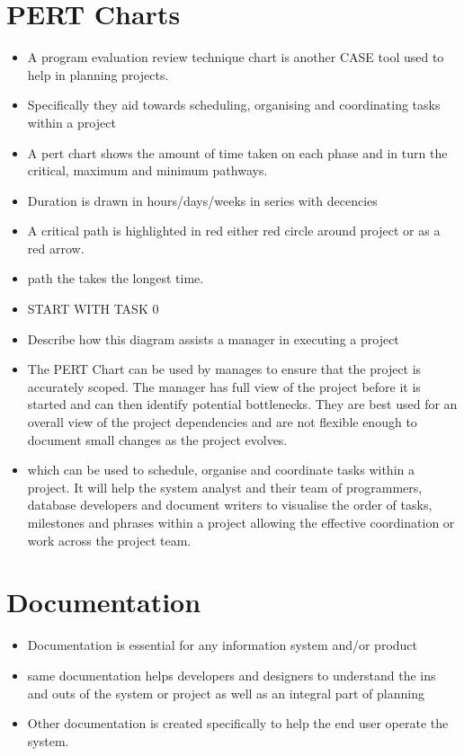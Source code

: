 \documentclass[12pt, a4, twoside]{article}
\begin{document}
  \section{PERT Charts}
  \begin{itemize}
    \item A program evaluation review technique chart is another CASE tool used to help in planning projects.
    \item Specifically they aid towards scheduling, organising and coordinating tasks within a project
    \item A pert chart shows the amount of time taken on each phase and in turn the critical, maximum and minimum pathways.
    \item Duration is drawn in hours/days/weeks in series with decencies
    \item A critical path is highlighted in red either red circle around project or as a red arrow.
    \item path the takes the longest time.
    \item START WITH TASK 0
    \item Describe how this diagram assists a manager in executing a project 
    \item The PERT Chart can be used by manages to ensure that the project is accurately scoped. The manager has full view of the project before it is started and can then identify potential bottlenecks. They are best used for an overall view of the project dependencies and are not flexible enough to document small changes as the project evolves. 
    \item which can be used to schedule, organise and coordinate tasks within a project. It will help the system analyst and their team of programmers, database developers and document writers to visualise the order of tasks, milestones and phrases within a project allowing the effective coordination or work across the project team. 
  \end{itemize}

  \section{Documentation}
  \begin{itemize}
    \item Documentation is essential for any information system and/or product
    \item same documentation helps developers and designers to understand the ins and outs of the system or project as well as an integral part of planning
    \item Other documentation is created specifically to help the end user operate the system.
  \end{itemize}
\end{document}
